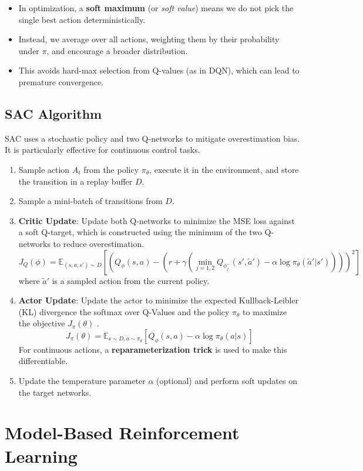 \documentclass[12pt]{article}
\begin{document}
\begin{itemize}
    \item In optimization, a \textbf{soft maximum} (or \emph{soft value}) means we do not pick the single best action deterministically.
    \item Instead, we average over all actions, weighting them by their probability under $\pi$, and encourage a broader distribution.
    \item This avoids hard-max selection from Q-values (as in DQN), which can lead to premature convergence.
\end{itemize}


\subsection{SAC Algorithm}
SAC uses a stochastic policy and two Q-networks to mitigate overestimation bias. It is particularly effective for continuous control tasks.
\begin{enumerate}
    \item Sample action $A_t$ from the policy $\pi_\theta$, execute it in the environment, and store the transition in a replay buffer $D$.
    \item Sample a mini-batch of transitions from $D$.
    \item \textbf{Critic Update}: Update both Q-networks to minimize the MSE loss against a soft Q-target, which is constructed using the minimum of the two Q-networks to reduce overestimation.
    $$ J_Q(\phi) = \mathbb{E}_{(s,a,s') \sim D} \left[ \left( Q_\phi(s,a) - \left(r + \gamma \left( \min_{j=1,2} Q_{\phi_j^-}(s', \tilde{a}') - \alpha \log \pi_\theta(\tilde{a}'|s') \right)\right) \right)^2 \right] $$
    where $\tilde{a}'$ is a sampled action from the current policy.
    \item \textbf{Actor Update}: Update the actor to minimize the expected Kullback-Leibler (KL) divergence the softmax over Q-Values and the policy $\pi_\theta$ to maximize the objective $ J_\pi(\theta)$  . 
    $$ J_\pi(\theta) = \mathbb{E}_{s \sim D, a \sim \pi_\theta} [ Q_\phi(s,a) - \alpha \log \pi_\theta(a|s)] $$
    For continuous actions, a \textbf{reparameterization trick} is used to make this differentiable.
    \item Update the temperature parameter $\alpha$ (optional) and perform soft updates on the target networks.
\end{enumerate}



\section{Model-Based Reinforcement Learning }
\end{document}
